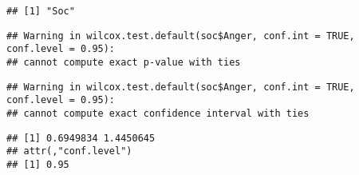 \documentclass[
]{article}
\newenvironment{Shaded}{\begin{snugshade}}{\end{snugshade}}
\newcommand{\AttributeTok}[1]{\textcolor[rgb]{0.77,0.63,0.00}{#1}}
\newcommand{\ConstantTok}[1]{\textcolor[rgb]{0.00,0.00,0.00}{#1}}
\newcommand{\FloatTok}[1]{\textcolor[rgb]{0.00,0.00,0.81}{#1}}
\newcommand{\FunctionTok}[1]{\textcolor[rgb]{0.00,0.00,0.00}{#1}}
\newcommand{\NormalTok}[1]{#1}
\newcommand{\SpecialCharTok}[1]{\textcolor[rgb]{0.00,0.00,0.00}{#1}}
\begin{document}
\begin{verbatim}
## [1] "Soc"
\end{verbatim}

\begin{Shaded}
\end{Shaded}

\begin{verbatim}
## Warning in wilcox.test.default(soc$Anger, conf.int = TRUE, conf.level = 0.95):
## cannot compute exact p-value with ties
\end{verbatim}

\begin{verbatim}
## Warning in wilcox.test.default(soc$Anger, conf.int = TRUE, conf.level = 0.95):
## cannot compute exact confidence interval with ties
\end{verbatim}

\begin{verbatim}
## [1] 0.6949834 1.4450645
## attr(,"conf.level")
## [1] 0.95
\end{verbatim}
\end{document}
